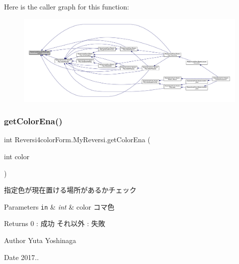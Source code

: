 Here is the caller graph for this function\+:
\nopagebreak
\begin{figure}[H]
\begin{center}
\leavevmode
\includegraphics[width=350pt]{class_reversi4color_form_1_1_my_reversi_ae184f1817b7dfac87613179e3e7e9124_icgraph}
\end{center}
\end{figure}
\mbox{\label{class_reversi4color_form_1_1_my_reversi_a5c18ae70cd8a10fee96f44e3a0e8621b}} 
\subsubsection{\texorpdfstring{get\+Color\+Ena()}{getColorEna()}}
{\footnotesize\ttfamily int Reversi4color\+Form.\+My\+Reversi.\+get\+Color\+Ena (\begin{DoxyParamCaption}\item[{int}]{color }\end{DoxyParamCaption})}



指定色が現在置ける場所があるかチェック 


\begin{DoxyParams}[1]{Parameters}
\mbox{\tt in}  & {\em int} & color コマ色 \\
\hline
\end{DoxyParams}
\begin{DoxyReturn}{Returns}
0 \+: 成功 それ以外 \+: 失敗 
\end{DoxyReturn}
\begin{DoxyAuthor}{Author}
Yuta Yoshinaga 
\end{DoxyAuthor}
\begin{DoxyDate}{Date}
2017.. 
\end{DoxyDate}



